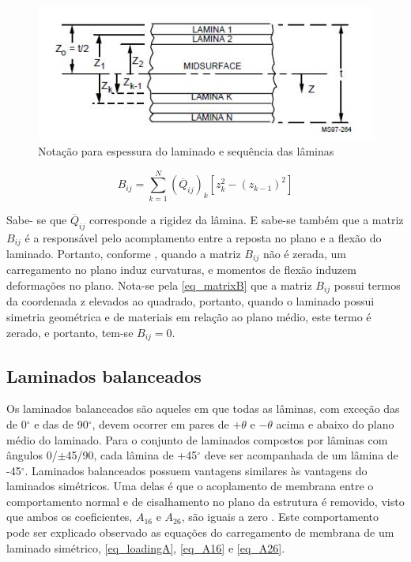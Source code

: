 \begin{figure}[h]
	\caption{\label{fig_laminate}Notação para espessura do laminado e sequência das lâminas}
  \centering
  \includegraphics[scale=1.0]{figura/Laminate}
\end{figure}

\begin{equation} \label{eq_matrixB}
B_{ij}
=
\sum_{k=1}^N (\overline{Q}_{ij})_k [z_k^2 - (z_{k-1})^2]
\end{equation}

Sabe- se que $ \overline{Q}_{ij} $ corresponde a rigidez da lâmina. E sabe-se também que a matriz $ B_{ij} $ é a responsável pelo acomplamento entre a reposta no plano e a flexão do laminado. Portanto, conforme \cite{nasa1997guidelines}, quando a matriz $ B_{ij} $ não é zerada, um carregamento no plano induz curvaturas, e momentos de flexão induzem deformações no plano. Nota-se pela \autoref{eq_matrixB} que a matriz $ B_{ij} $ possui termos da coordenada z elevados ao quadrado, portanto, quando o laminado possui simetria geométrica e de materiais em relação ao plano médio, este termo é zerado, e portanto, tem-se $ B_{ij} = 0$.

\subsection{Laminados balanceados}
Os laminados balanceados são aqueles em que todas as lâminas, com exceção das de 0$^{\circ}$ e das de 90$^{\circ}$, devem ocorrer em pares de $ +\theta $ e $ -\theta $ acima e abaixo do plano médio do laminado. Para o conjunto de laminados compostos por lâminas com ângulos 0/$\pm$45/90, cada lâmina de +45$^{\circ}$ deve ser acompanhada de um lâmina de -45$^{\circ}$.
Laminados balanceados possuem vantagens similares às vantagens do laminados simétricos. Uma delas é que o acoplamento de membrana entre o comportamento normal e de cisalhamento no plano da estrutura é removido, visto que ambos os coeficientes, $ A_{16} $ e $ A_{26} $, são iguais a zero \cite{nasa1997guidelines}. Este comportamento pode ser explicado observado as equações do carregamento de membrana de um laminado simétrico, \autoref{eq_loadingA}, \autoref{eq_A16} e \autoref{eq_A26}.

